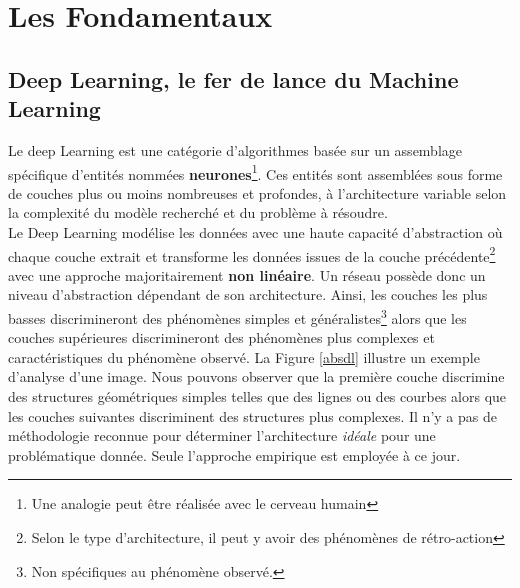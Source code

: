 \section{Les Fondamentaux}


\subsection{Deep Learning, le fer de lance du Machine Learning}
Le deep Learning est une catégorie d'algorithmes basée sur un assemblage spécifique d'entités nommées \textbf{neurones}\footnote{Une analogie peut être réalisée avec le cerveau humain}. Ces entités sont assemblées sous forme de couches plus ou moins nombreuses et profondes, à l'architecture variable selon la complexité du modèle recherché et du problème à résoudre.\\

\noindent Le Deep Learning modélise les données avec une haute capacité d'abstraction où chaque couche extrait et transforme les données issues de la couche précédente\footnote{Selon le type d'architecture, il peut y avoir des phénomènes de rétro-action} avec une approche majoritairement \textbf{non linéaire}. Un réseau possède donc un niveau d'abstraction dépendant de son architecture. Ainsi, les couches les plus basses discrimineront des phénomènes simples et généralistes\footnote{Non spécifiques au phénomène observé.} alors que les couches supérieures discrimineront des phénomènes plus complexes et caractéristiques du phénomène observé. La Figure \ref{absdl} illustre un exemple d'analyse d'une image. Nous pouvons observer que la première couche discrimine des structures géométriques simples telles que des lignes ou des courbes alors que les couches suivantes discriminent des structures plus complexes. Il n'y a pas de méthodologie reconnue pour déterminer l'architecture \textit{idéale} pour une problématique donnée. Seule l'approche empirique est employée à ce jour.\\

